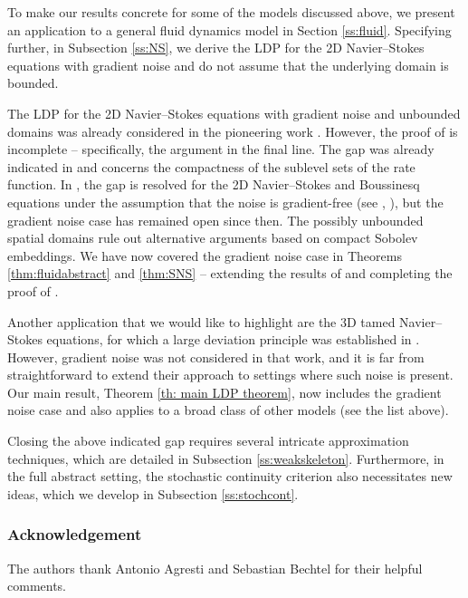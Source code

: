 \documentclass{amsart}
\newcommand{\<}{\langle}
\newcommand{\?}{\rangle}
\theoremstyle{plain}
\theoremstyle{remark}
\theoremstyle{plain}
\numberwithin{equation}{section}
\begin{document}
To make our results concrete for some of the models discussed above, we present an application to a general fluid dynamics model in Section \ref{ss:fluid}. 
Specifying further, in Subsection \ref{ss:NS}, we derive the LDP for the 2D Navier--Stokes equations with gradient noise and do not assume that the underlying domain is bounded.  

The LDP for the 2D Navier--Stokes equations with gradient noise and unbounded domains was already considered in the pioneering work \cite{sritharansundar06}. However, the proof of \cite[Lem. 4.5]{sritharansundar06} is incomplete -- specifically, the argument in the final line. 
The gap was already indicated in \cite[p. 2054]{duanmillet09} and concerns the compactness of the sublevel sets of the rate function. 
In \cite{chueshovmillet10, duanmillet09}, the gap is resolved for the 2D Navier--Stokes and Boussinesq equations under the assumption that the noise is gradient-free (see \cite[Th.  3.2]{chueshovmillet10}, \cite[Ass. A Bis, p. 2072]{duanmillet09}), but the gradient noise case has remained open since then.  
The possibly unbounded spatial domains rule out alternative arguments based on compact Sobolev embeddings. 
We have now  covered the gradient noise case in Theorems \ref{thm:fluidabstract} and \ref{thm:SNS} -- extending the results of \cite{chueshovmillet10, duanmillet09} and completing the proof of \cite{sritharansundar06}. 

Another application that we would like to highlight are the 3D tamed Navier--Stokes equations, for which a large deviation principle was established in \cite{RoZhZh}. However, gradient noise was not considered in that work, and it is far from straightforward to extend their approach to settings where such noise is present. 
Our main result, Theorem \ref{th: main LDP theorem},  now includes the gradient noise case and also applies to a broad class of other models (see the list above). 

Closing the above indicated gap requires several intricate approximation techniques, which are detailed in Subsection \ref{ss:weakskeleton}. Furthermore, in the full abstract setting, the stochastic continuity criterion also necessitates new ideas, which we develop in Subsection \ref{ss:stochcont}.  

\subsubsection*{Acknowledgement}
The authors thank Antonio Agresti and Sebastian Bechtel for their helpful comments.
\end{document}
